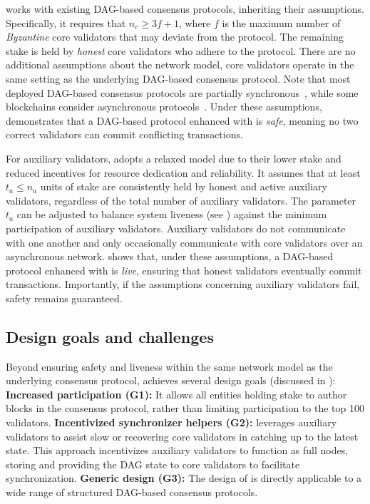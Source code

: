 \sysname works with existing DAG-based consensus protocols, inheriting their assumptions. Specifically, it requires that $n_c \geq 3f + 1$, where $f$ is the maximum number of \emph{Byzantine} core validators that may deviate from the protocol. The remaining stake is held by \emph{honest} core validators who adhere to the protocol. There are no additional assumptions about the network model, core validators operate in the same setting as the underlying DAG-based consensus protocol. Note that most deployed DAG-based consensus protocols are partially synchronous~\cite{dwork1988consensus}, while some blockchains consider asynchronous protocols~\cite{sui-code}. Under these assumptions,  demonstrates that a DAG-based protocol enhanced with \sysname is \emph{safe}, meaning no two correct validators can commit conflicting transactions.

For auxiliary validators, \sysname adopts a relaxed model due to their lower stake and reduced incentives for resource dedication and reliability. It assumes that at least $t_a \leq n_a$ units of stake are consistently held by honest and active auxiliary validators, regardless of the total number of auxiliary validators. The parameter $t_a$ can be adjusted to balance system liveness (see ) against the minimum participation of auxiliary validators. Auxiliary validators do not communicate with one another and only occasionally communicate with core validators over an asynchronous network.  shows that, under these assumptions, a DAG-based protocol enhanced with \sysname is \emph{live}, ensuring that honest validators eventually commit transactions. Importantly, if the assumptions concerning auxiliary validators fail, safety remains guaranteed.

\subsection{Design goals and challenges} \label{sec:goals}

Beyond ensuring safety and liveness within the same network model as the underlying consensus protocol, \sysname achieves several design goals (discussed in ):
\textbf{Increased participation (G1):} It allows all entities holding stake to author blocks in the consensus protocol, rather than limiting participation to the top 100 validators.
\textbf{Incentivized synchronizer helpers (G2):} \sysname leverages auxiliary validators to assist slow or recovering core validators in catching up to the latest state. This approach incentivizes auxiliary validators to function as full nodes, storing and providing the DAG state to core validators to facilitate synchronization.
\textbf{Generic design (G3):} The design of \sysname is directly applicable to a wide range of structured DAG-based consensus protocols.

